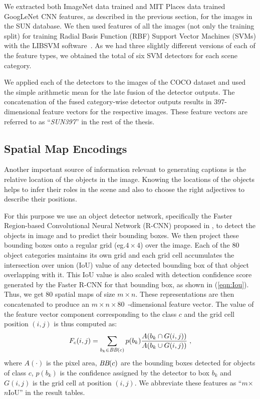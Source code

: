 We extracted both ImageNet data trained and MIT Places data trained GoogLeNet
CNN features, as described in the previous section, for the images in the SUN
database.
We then used features of all the images (not only the training split) for
training Radial Basis Function (RBF) Support Vector Machines (SVMs) with the
LIBSVM software~\cite{LIBSVM}.
As we had three slightly different versions of each of the feature types, we
obtained the total of six SVM detectors for each scene category.

We applied each of the detectors to the images of the COCO dataset and used the
simple arithmetic mean for the late fusion of the detector outputs.
The concatenation of the fused category-wise detector outputs results in
397-dimensional feature vectors for the respective images.
These feature vectors are referred to as ``\emph{SUN397}'' in the rest of the
thesis.

\subsection{Spatial Map Encodings}
Another important source of information relevant to generating captions is the
relative location of the objects in the image. 
Knowing the locations of the objects helps to infer their roles in the scene and
also to choose the right adjectives to describe their positions.

For this purpose we use an object detector network, specifically the Faster
Region-based Convolutional Neural Network (R-CNN) proposed in
\cite{ren15fasterrcnn}, to detect the objects in image and to predict their
bounding boxes.
We then project these bounding boxes onto a regular grid (eg.\@ $4\times4$) over
the image. 
Each of the 80 object categories maintains its own grid and each grid cell
accumulates the intersection over union (IoU) value of any detected bounding box
of that object overlapping with it.
This IoU value is also scaled with detection confidence score generated by the
Faster R-CNN for that bounding box, as shown in (\ref{eqn:Iou}).
Thus, we get 80 spatial maps of size $m\times n$. 
These representations are then concatenated to produce an $m\times
n\times80$~-dimensional feature vector.
The value of the feature vector component corresponding to the class $c$ and the
grid cell position $(i,j)$ is thus computed as:
\begin{equation} \label{eqn:Iou} F_c(i,j) = \sum_{b_k \in \text{\it
BB}(c)}p(b_k)\frac{ A(b_k \cap G(i,j))}{A(b_k \cup G(i,j))} \;, \end{equation}
where $A(\cdot)$ is the pixel area, $\text{\it BB}(c)$ are the bounding boxes
detected for objects of class $c$, $p(b_k)$ is the confidence assigned by the
detector to box $b_k$ and $G(i,j)$ is the grid cell at position $(i,j)$.
We abbreviate these features as ``$m$$\times${}$n$IoU'' in the result tables.

